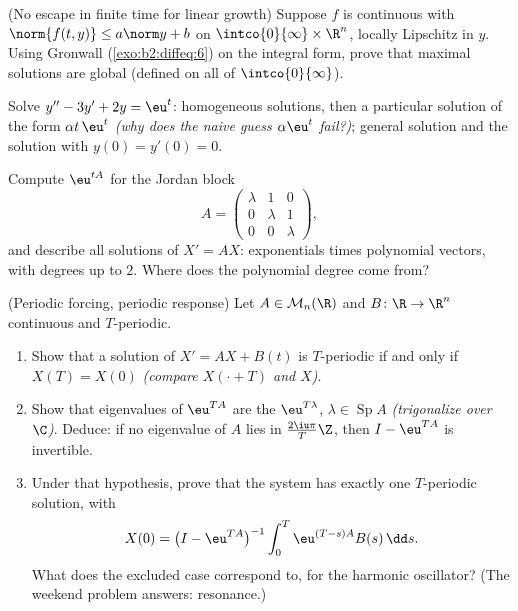 \begin{exercise}[$\star\star\star$]\label{exo:b2:diffeq:9}
(No escape in finite time for linear growth) Suppose $f$ is
continuous with $\norm{f(t, y)} \leq a\norm y + b$ on
$\intco{0}{\infty} \times \R^n$, locally Lipschitz in $y$. Using
Gronwall (\cref{exo:b2:diffeq:6}) on the integral form, prove that
maximal solutions are global (defined on all of
$\intco{0}{\infty}$).
\end{exercise}

\begin{exercise}[$\star$]\label{exo:b2:diffeq:10}
Solve $y'' - 3y' + 2y = \eu^{t}$: homogeneous solutions, then a
particular solution of the form $\alpha t\,\eu^{t}$ \emph{(why
does the naive guess $\alpha\eu^t$ fail?)}; general solution and
the solution with $y(0) = y'(0) = 0$.
\end{exercise}

\begin{exercise}[$\star\star$]\label{exo:b2:diffeq:11}
Compute $\eu^{tA}$ for the Jordan block
\[
A = \begin{pmatrix} \lambda & 1 & 0\\ 0 & \lambda & 1\\
0 & 0 & \lambda\end{pmatrix},
\]
and describe all solutions of $X' = AX$: exponentials times
polynomial vectors, with degrees up to $2$. Where does the
polynomial degree come from?
\end{exercise}

\begin{exercise}[$\star\star\star$]\label{exo:b2:diffeq:12}
(Periodic forcing, periodic response) Let $A \in
\mathcal{M}_n(\R)$ and $B \colon \R \to \R^n$ continuous and
$T$-periodic.
\begin{enumerate}
  \item Show that a solution of $X' = AX + B(t)$ is
        $T$-periodic if and only if $X(T) = X(0)$
        \emph{(compare $X(\cdot + T)$ and $X$)}.
  \item Show that eigenvalues of $\eu^{TA}$ are the
        $\eu^{T\lambda}$, $\lambda \in \operatorname{Sp}A$
        \emph{(trigonalize over $\C$)}. Deduce: if no
        eigenvalue of $A$ lies in $\frac{2\iu\pi}{T}\Z$, then
        $I - \eu^{TA}$ is invertible.
  \item Under that hypothesis, prove that the system has
        exactly one $T$-periodic solution, with
        \[
        X(0) = \bigl(I - \eu^{TA}\bigr)^{-1}
        \int_0^{T}\eu^{(T-s)A}B(s)\,\dd s .
        \]
        What does the excluded case correspond to, for the
        harmonic oscillator? (The weekend problem answers:
        resonance.)
\end{enumerate}
\end{exercise}


